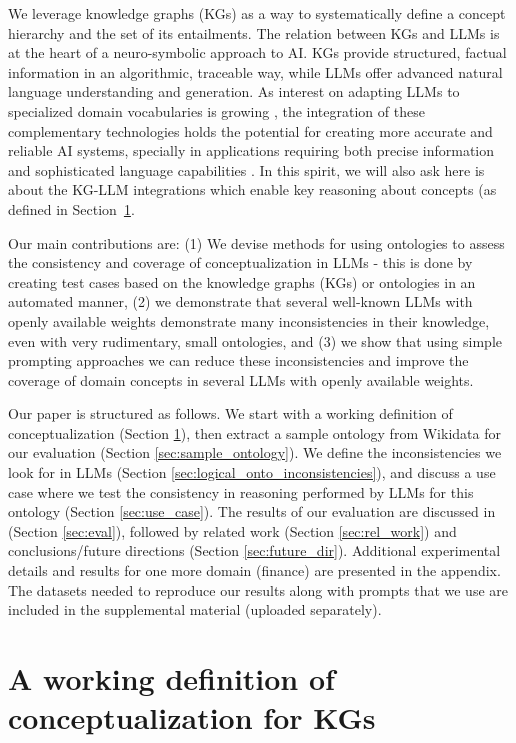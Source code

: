\documentclass{article} %
\begin{document}
We leverage knowledge graphs (KGs) as a way to systematically define a concept hierarchy and the set of its entailments. The relation between KGs and LLMs is at the heart of a neuro-symbolic approach to AI. KGs provide structured, factual information in an algorithmic, traceable way, while LLMs offer advanced natural language understanding and generation. As interest on adapting LLMs to specialized domain vocabularies is growing \citep{SkilledLLM_1,SkilledLLM_2}, the integration of these complementary technologies holds the potential for creating more accurate and reliable AI systems, specially in applications requiring both precise information and sophisticated language capabilities \citep{alkhamissi2022review}. In this spirit, we will also ask here is about the KG-LLM integrations which enable key reasoning about concepts (as defined in Section~\ref{sec:defn_concept}. 

Our main contributions are: (1) We devise methods for using ontologies to assess the consistency and coverage of conceptualization in LLMs - this is done by creating test cases based on the knowledge graphs (KGs) or ontologies in an automated manner, (2) we demonstrate that several well-known LLMs with openly available weights demonstrate many inconsistencies in their knowledge, even with very rudimentary, small ontologies, and (3) we show that using simple prompting approaches we can reduce these inconsistencies and improve the coverage of domain concepts in several LLMs with openly available weights.

Our paper is structured as follows. We start with a working definition of conceptualization (Section \ref{sec:defn_concept}), then extract a sample ontology from Wikidata for our evaluation (Section \ref{sec:sample_ontology}). We define the inconsistencies we look for in LLMs (Section \ref{sec:logical_onto_inconsistencies}), and discuss a use case where we test the consistency in reasoning performed by LLMs for this ontology (Section \ref{sec:use_case}).  The results of our evaluation are discussed in (Section \ref{sec:eval}), followed by related work (Section \ref{sec:rel_work}) and conclusions/future directions (Section \ref{sec:future_dir}). Additional experimental details and results for one more domain (finance) are presented in the appendix. The datasets needed to reproduce our results along with prompts that we use are included in the supplemental material (uploaded separately).

\section{A working definition of conceptualization for KGs}
\label{sec:defn_concept}
\end{document}
